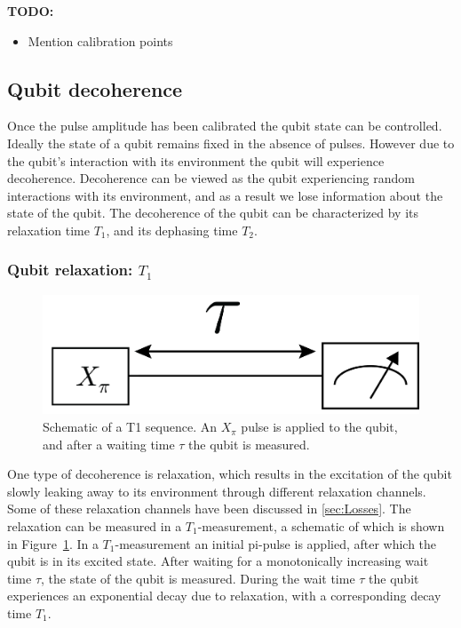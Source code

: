         \textbf{TODO:}
        \begin{itemize}
          \item Mention calibration points
        \end{itemize}

      \subsection{Qubit decoherence}
        Once the pulse amplitude has been calibrated the qubit state can be controlled. Ideally the state of a qubit remains fixed in the absence of pulses. However due to the qubit's interaction with its environment the qubit will experience decoherence. Decoherence can be viewed as the qubit experiencing random interactions with its environment, and as a result we lose information about the state of the qubit. The decoherence of the qubit can be characterized by its relaxation time $T_1$, and its dephasing time $T_2$.

        \subsubsection{Qubit relaxation: $T_1$}
          \label{sec:Qubit relaxation: $T_1$}
          \begin{figure}
            \begin{center}
            \vspace{-30pt}
              \includegraphics[width=\textwidth]{../Figures/Qubit characterization/T1 decoherence.png}
            \end{center}
            \vspace{-20 pt}
            \caption{Schematic of a T1 sequence. An $X_\pi$ pulse is applied to the qubit, and after a waiting time $\tau$ the qubit is measured.}
            \label{fig:T1 schematic}
          \end{figure}

          One type of decoherence is relaxation, which results in the excitation of the qubit slowly leaking away to its environment through different relaxation channels. Some of these relaxation channels have been discussed in \ref{sec:Losses}. The relaxation can be measured in a $T_1$-measurement, a schematic of which is shown in Figure~\ref{fig:T1 schematic}. In a $T_1$-measurement an initial pi-pulse is applied, after which the qubit is in its excited state. After waiting for a monotonically increasing wait time $\tau$, the state of the qubit is measured. During the wait time $\tau$ the qubit experiences an exponential decay due to relaxation, with a corresponding decay time $T_1$.

